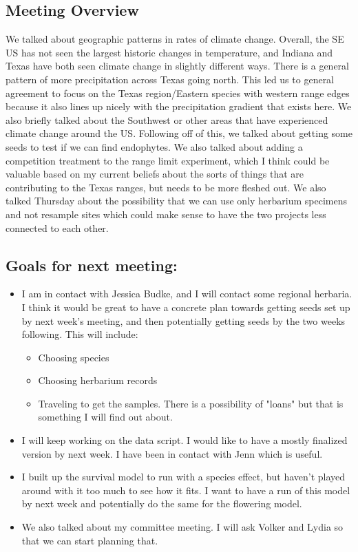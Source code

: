 \documentclass{article}
\newcommand{\tom}[1]{{\textit{\color{WildStrawberry}{[#1]}}}}
\begin{document}
\subsection*{Meeting Overview}
We talked about geographic patterns in rates of climate change. Overall, the SE US has not seen the largest historic changes in temperature, and Indiana and Texas have both seen climate change in slightly different ways. There is a general pattern of more precipitation across Texas going north. This led us to general agreement to focus on the Texas region/Eastern species with western range edges because it also lines up nicely with the precipitation gradient that exists here. We also briefly talked about the Southwest or other areas that have experienced climate change around the US. Following off of this, we talked about getting some seeds to test if we can find endophytes. We also talked about adding a competition treatment to the range limit experiment, which I think could be valuable based on my current beliefs about the sorts of things that are contributing to the Texas ranges, but needs to be more fleshed out. We also talked Thursday about the possibility that we can use only herbarium specimens and not resample sites which could make sense to have the two projects less connected to each other.\tom{This is a good recap, but it mixes up the herbarium project and the range limits project, which are obviously related but different. Going forward I think it would be good to provide a recap on each of your projects/activities (these two things, plus the stochastic demography project, plus the endophyte elimination experiment).}

\subsection*{Goals for next meeting:}
\begin{itemize}
\item{I am in contact with Jessica Budke, and I will contact some regional herbaria. I think it would be great to have a concrete plan towards getting seeds set up by next week's meeting, and then potentially getting seeds by the two weeks following. This will include:
\begin{itemize}
\item{Choosing species}
\item{Choosing herbarium records}
\item{Traveling to get the samples. There is a possibility of "loans" but that is something I will find out about.}
\end{itemize}}
\item{I will keep working on the data script. I would like to have a mostly finalized version by next week. I have been in contact with Jenn which is useful.}
\item{I built up the survival model to run with a species effect, but haven't played around with it too much to see how it fits. I want to have a run of this model by next week and potentially do the same for the flowering model.}
\item{We also talked about my committee meeting. I will ask Volker and Lydia so that we can start planning that.}
\end{itemize}
\end{document}
